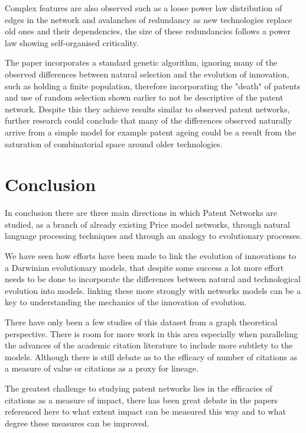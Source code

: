 \documentclass[12pt,journal,compsoc]{IEEEtran}
\begin{document}
Complex features are also observed such as a loose power law distribution of edges in the network and avalanches of redundancy as new technologies replace old ones and their dependencies, the size of these redundancies follows a power law showing self-organised criticality. 

The paper incorporates a standard genetic algorithm, ignoring many of the observed differences between natural selection and the evolution of innovation, such as holding a finite population, therefore incorporating the "death" of patents and use of random selection shown earlier to not be descriptive of the patent network. Despite this they achieve results similar to observed patent networks, further research could conclude that many of the differences observed naturally arrive from a simple model for example patent ageing could be a result from the saturation of combinatorial space around older technologies.  
\section{Conclusion}
In conclusion there are three main directions in which Patent Networks are studied, as a branch of already existing Price model networks, through natural language processing techniques and through an analogy to evolutionary processes. 

We have seen how efforts have been made to link the evolution of innovations to a Darwinian evolutionary models, that despite some success a lot more effort needs to be done to incorporate the differences between natural and technological evolution into models. linking these more strongly with networks models can be a key to understanding the mechanics of the innovation of evolution.

There have only been a few studies of this dataset from a graph theoretical perspective. There is room for more work in this area especially when paralleling the advances of the academic citation literature to include more subtlety to the models. Although there is still debate as to the efficacy of number of citations as a measure of value or citations as a proxy for lineage. 

The greatest challenge to studying patent networks lies in the efficacies of citations as a measure of impact, there has been great debate in the papers referenced here to what extent impact can be measured this way and to what degree these measures can be improved.  
\small


\end{document}
